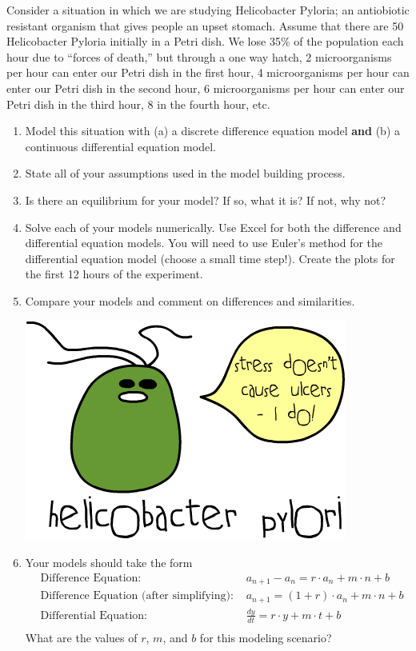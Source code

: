 \begin{lab}
    
Consider a situation in which we are studying Helicobacter Pyloria; an antiobiotic
resistant organism that gives
people an upset stomach.
Assume that there are 50 Helicobacter Pyloria initially in a Petri dish. We lose 35\% of the population each hour due
to ``forces of death,'' but through a one way hatch, 2 microorganisms per hour can enter our
Petri dish in the first hour, 4 microorganisms per hour can enter our Petri dish in the second hour,
6 microorganisms per hour can enter our Petri dish in the third hour, 8 in the fourth hour, etc.
\begin{enumerate}
    \item Model this situation with (a) a discrete difference equation model {\bf and} (b)
        a continuous differential equation model. 
    \item State all of your assumptions used in the model building process. 
    \item Is there an equilibrium for your model?  If so, what it is?  If not, why not?
    \item Solve each of your models numerically.  Use Excel for both the difference and
        differential equation models.  You will need to use Euler's method for the
        differential equation model (choose a small time step!). Create the plots for the
        first 12 hours of the experiment.
    \item Compare your models and comment on differences and similarities.

        \begin{center}
            \includegraphics[width=0.3\columnwidth]{images/helicobacter.png}
        \end{center}


    \item Your models should take the form
        \begin{align*}
            &\text{Difference Equation: }  & a_{n+1} - a_n =  r \cdot a_n + m \cdot n + b \\
            &\text{Difference Equation (after simplifying): }  & a_{n+1} =  (1+r) \cdot a_n + m \cdot n + b \\
            &\text{Differential Equation: }  &  \frac{dy}{dt} =  r \cdot y + m \cdot t + b \\
        \end{align*}
        What are the values of $r$, $m$, and $b$ for this modeling scenario?


\end{enumerate}
\end{lab}

